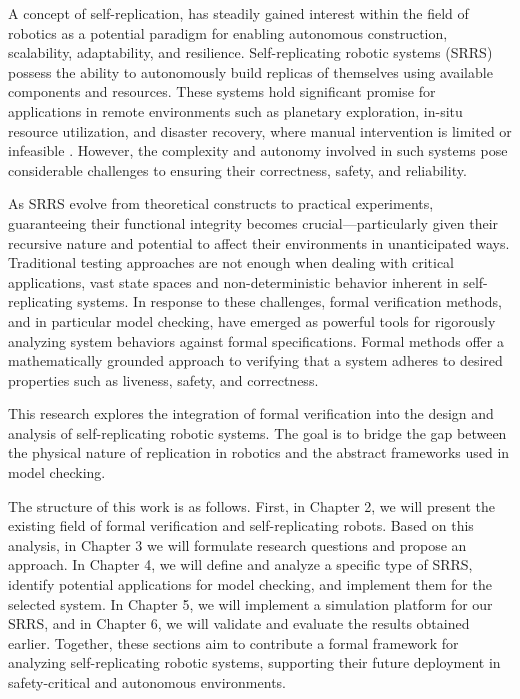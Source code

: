 A concept of self-replication, has steadily 
gained interest within the field of robotics as a potential paradigm for enabling 
autonomous construction, scalability, adaptability, and resilience. Self-replicating 
robotic systems (SRRS) possess the ability to autonomously build replicas of 
themselves using available components and resources. These systems hold significant 
promise for applications in remote environments such as planetary exploration,
in-situ resource utilization, and disaster recovery, where manual intervention 
is limited or infeasible \cite{Suthakorn2002SpaceUtilization} \cite{Nasa1980ConferencePublication}.
However, the complexity and autonomy involved in such 
systems pose considerable challenges to ensuring their correctness, safety, and reliability.

As SRRS evolve from theoretical constructs to practical experiments, guaranteeing 
their functional integrity becomes crucial—particularly given their recursive 
nature and potential to affect their environments in unanticipated ways. 
Traditional testing approaches are not enough when dealing with critical 
applications, vast state spaces and non-deterministic behavior inherent 
in self-replicating systems. In response to these challenges, 
formal verification methods, and in particular model checking,
have emerged as powerful tools for rigorously analyzing system behaviors against 
formal specifications.
Formal methods offer a mathematically grounded approach to verifying that a 
system adheres to desired properties such as liveness, safety, 
and correctness. 

This research explores the integration of formal verification into the design 
and analysis of self-replicating robotic systems. The goal is to bridge the 
gap between the physical nature of replication in robotics and the 
abstract frameworks used in model checking. 

The structure of this work is as follows. 
First, in Chapter 2, we will present the existing field of formal verification 
and self-replicating robots. Based on this analysis, in Chapter 3 
we will formulate research questions and propose an approach.
In Chapter 4, we will define and analyze a specific type of SRRS, 
identify potential applications for model checking, and implement them 
for the selected system.
In Chapter 5, we will implement a simulation platform for our SRRS, 
and in Chapter 6,  we will validate and evaluate the results obtained earlier.
Together, these sections aim to contribute a formal 
framework for analyzing self-replicating robotic systems, supporting their future 
deployment in safety-critical and autonomous environments.
